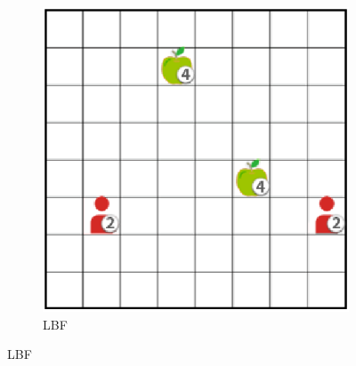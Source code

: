 \begin{figure}
\begin{subfigure}[c]{0.225\textwidth}
        \centering
        \includegraphics[width=\textwidth]{Figures/MADRL/lbf.png}
        \caption{LBF}
        \label{fig:LBF}
    \end{subfigure}
    

\end{figure}
